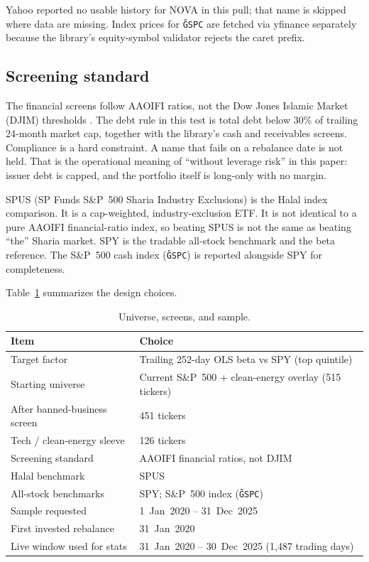 \documentclass[11pt,letterpaper]{article}
\begin{document}
Yahoo reported no usable history for NOVA in this pull; that name is skipped where data are missing. Index prices for \texttt{\^GSPC} are fetched via yfinance separately because the library's equity-symbol validator rejects the caret prefix.

\subsection{Screening standard}

The financial screens follow AAOIFI ratios, not the Dow Jones Islamic Market (DJIM) thresholds \citep{aaoifi21,derigs2008}. The debt rule in this test is total debt below 30\% of trailing 24-month market cap, together with the library's cash and receivables screens. Compliance is a hard constraint. A name that fails on a rebalance date is not held. That is the operational meaning of ``without leverage risk'' in this paper: issuer debt is capped, and the portfolio itself is long-only with no margin.

SPUS (SP Funds S\&P~500 Sharia Industry Exclusions) is the Halal index comparison. It is a cap-weighted, industry-exclusion ETF. It is not identical to a pure AAOIFI financial-ratio index, so beating SPUS is not the same as beating ``the'' Sharia market. SPY is the tradable all-stock benchmark and the beta reference. The S\&P~500 cash index (\texttt{\^GSPC}) is reported alongside SPY for completeness.

Table~\ref{tab:universe} summarizes the design choices.

\begin{table}[htbp]
\centering
\caption{Universe, screens, and sample.}
\label{tab:universe}
\begin{tabular}{ll}
\toprule
Item & Choice \\
\midrule
Target factor & Trailing 252-day OLS beta vs SPY (top quintile) \\
Starting universe & Current S\&P~500 + clean-energy overlay (515 tickers) \\
After banned-business screen & 451 tickers \\
Tech / clean-energy sleeve & 126 tickers \\
Screening standard & AAOIFI financial ratios, not DJIM \\
Halal benchmark & SPUS \\
All-stock benchmarks & SPY; S\&P~500 index (\texttt{\^GSPC}) \\
Sample requested & 1~Jan~2020 -- 31~Dec~2025 \\
First invested rebalance & 31~Jan~2020 \\
Live window used for stats & 31~Jan~2020 -- 30~Dec~2025 (1{,}487 trading days) \\
\bottomrule
\end{tabular}
\end{table}
\end{document}
